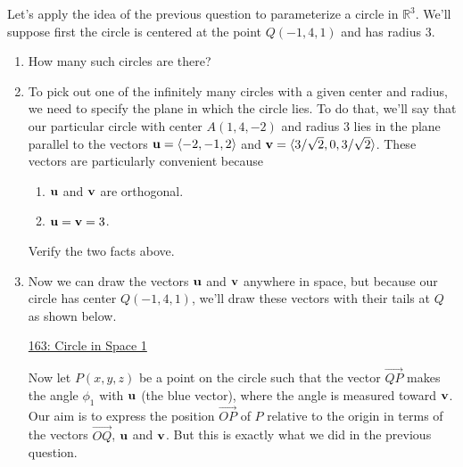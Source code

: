 \documentclass{ximera}
\begin{document}
\begin{question}  \label{Qdfrr54r55thlnmvvc}
Let's apply the idea of the previous question to parameterize a circle in $\mathbb{R}^3$. We'll suppose first the circle is centered at the point $Q(-1,4,1)$ and has radius $3$. 

\begin{enumerate}

\item{How many such circles are there?
\begin{multipleChoice}
\end{multipleChoice}
}

\item{To pick out one of the infinitely many circles with a given center and radius, we need to specify the plane in which the circle lies. To do that, we'll say that our particular circle with center $A(1,4,-2)$ and radius $3$ lies in the plane parallel to the vectors ${\bf u} = \langle -2, -1, 2 \rangle$ and ${\bf v}= \langle 3/\sqrt{2},0,3/\sqrt{2} \rangle$. These vectors are particularly convenient because
\begin{enumerate}
\item {${\bf u}$ and ${\bf v}$ are orthogonal.}

\item{${\bf u} = {\bf v} = 3$.}
\end{enumerate}

\begin{freeResponse}
Verify the two facts above.
\end{freeResponse}
}

\item{Now we can draw the vectors ${\bf u}$ and ${\bf v}$ anywhere in space, but because our circle has center $Q(-1,4,1)$, we'll draw these vectors with their tails at $Q$ as shown below.

\begin{onlineOnly}
    \begin{center}
\end{center}
\end{onlineOnly}

\href{https://www.desmos.com/3d/bpv9fp9prt}{163: Circle in Space 1}

Now let $P(x,y,z)$ be a point on the circle such that the vector $\overrightarrow{QP}$ makes the angle $\phi_1$ with ${\bf u}$ (the blue vector), where the angle is measured toward ${\bf v}$. Our aim is to express the position $\overrightarrow{OP}$ of $P$ relative to the origin in terms of the vectors $\overrightarrow{OQ}$, ${\bf u}$ and ${\bf v}$. But this is exactly what we did in the previous question. 

}
\end{enumerate}
\end{question}
\end{document}
